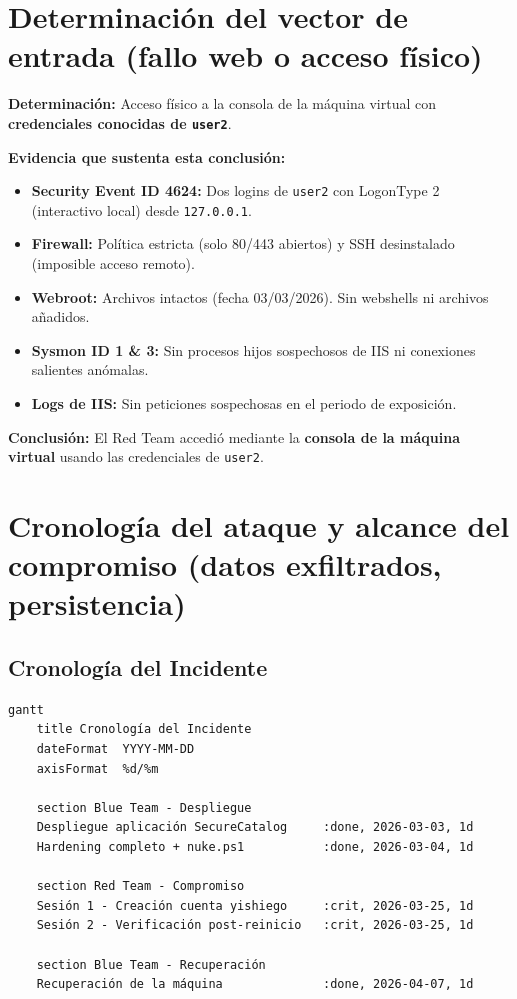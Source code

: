 \section[Vector de Entrada (Web/Físico)]{Determinación del vector de entrada (fallo web o acceso físico)}
\label{sec:vector_entrada}

\textbf{Determinación:} Acceso físico a la consola de la máquina virtual con \textbf{credenciales conocidas de \texttt{user2}}.

\textbf{Evidencia que sustenta esta conclusión:}
\begin{itemize}
    \item \textbf{Security Event ID 4624:} Dos logins de \texttt{user2} con LogonType 2 (interactivo local) desde \texttt{127.0.0.1}.
    \item \textbf{Firewall:} Política estricta (solo 80/443 abiertos) y SSH desinstalado (imposible acceso remoto).
    \item \textbf{Webroot:} Archivos intactos (fecha 03/03/2026). Sin webshells ni archivos añadidos.
    \item \textbf{Sysmon ID 1 \& 3:} Sin procesos hijos sospechosos de IIS ni conexiones salientes anómalas.
    \item \textbf{Logs de IIS:} Sin peticiones sospechosas en el periodo de exposición.
\end{itemize}

\textbf{Conclusión:} El Red Team accedió mediante la \textbf{consola de la máquina virtual} usando las credenciales de \texttt{user2}.

\section[Cronología y Alcance del Compromiso]{Cronología del ataque y alcance del compromiso (datos exfiltrados, persistencia)}
\label{sec:cronologia_alcance}

\subsection{Cronología del Incidente}
\begin{lstlisting}
gantt
    title Cronología del Incidente
    dateFormat  YYYY-MM-DD
    axisFormat  %d/%m

    section Blue Team - Despliegue
    Despliegue aplicación SecureCatalog     :done, 2026-03-03, 1d
    Hardening completo + nuke.ps1           :done, 2026-03-04, 1d
    
    section Red Team - Compromiso
    Sesión 1 - Creación cuenta yishiego     :crit, 2026-03-25, 1d
    Sesión 2 - Verificación post-reinicio   :crit, 2026-03-25, 1d
    
    section Blue Team - Recuperación
    Recuperación de la máquina              :done, 2026-04-07, 1d
\end{lstlisting}

